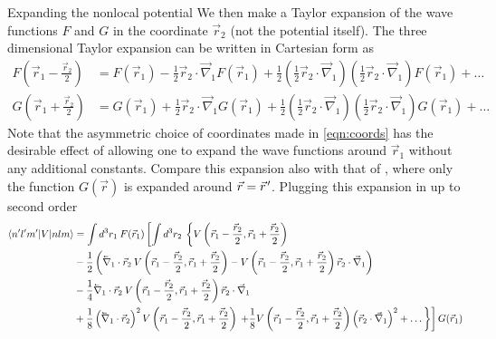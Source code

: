 \begin{section}{Expanding the nonlocal potential}
We then make a Taylor expansion of the wave functions $F$ and $G$ in the coordinate $\vec{r}_2$ (not the potential itself). The three dimensional Taylor expansion can be written in Cartesian form as
\begin{align}\label{eq:TaylorExpansion}
F\left(\vec{r}_1-\frac{\vec{r}_2}{2}\right)&=F(\vec{r}_1)-\frac{1}{2}\vec{r}_2\cdot\vec{\nabla}_1 F(\vec{r}_1)+\frac{1}{2}\left(\frac{1}{2}\vec{r}_2\cdot\vec{\nabla}_1\right)\left(\frac{1}{2}\vec{r}_2\cdot\vec{\nabla}_1\right)F(\vec{r}_1)+\dots 
\\
G\left(\vec{r}_1+\frac{\vec{r}_2}{2}\right)&=G(\vec{r}_1)+\frac{1}{2}\vec{r}_2\cdot\vec{\nabla}_1 G(\vec{r}_1)+\frac{1}{2}\left(\frac{1}{2}\vec{r}_2\cdot\vec{\nabla}_1\right)\left(\frac{1}{2}\vec{r}_2\cdot\vec{\nabla}_1\right)G(\vec{r}_1)+\dots
\end{align}
Note that the asymmetric choice of coordinates made in \eqref{eqn:coords} has the desirable effect of allowing one to expand the wave functions around $\vec{r}_1$ without any additional constants. Compare this expansion also with that of \cite{0954-3899-26-3-310}, where only the function $G(\vec{r})$ is expanded around $\vec{r}=\vec{r}\mkern2mu'$. Plugging this expansion in up to second order 
\begin{equation}\label{eqn:expansionCartesian}
\begin{split}
\braket{n' l' m'| V | n l m} &= \int d^3r_1\: F(\vec{r}_1)\left[\int d^3r_2\:\left\{V\left(\vec{r}_1-\frac{\vec{r}_2}{2},\vec{r}_1+\frac{\vec{r}_2}{2}\right) \right.\right. \\
&-\frac{1}{2} \left(\lvec{\nabla}_1\cdot\vec{r}_2\: V\left(\vec{r}_1-\frac{\vec{r}_2}{2},\vec{r}_1+\frac{\vec{r}_2}{2}\right) -
V\left(\vec{r}_1-\frac{\vec{r}_2}{2},\vec{r}_1+\frac{\vec{r}_2}{2}\right) \vec{r}_2\cdot\vec{\nabla}_1
\right)\\
&-\frac{1}{4}\lvec{\nabla}_1\cdot\vec{r}_2\: V\left(\vec{r}_1-\frac{\vec{r}_2}{2},\vec{r}_1+\frac{\vec{r}_2}{2}\right) \vec{r}_2\cdot\vec{\nabla}_1\\
&+\frac{1}{8}\left(\lvec{\nabla}_{1}\cdot\vec{r}_2\right)^2 V\left(\vec{r}_1-\frac{\vec{r}_2}{2},\vec{r}_1+\frac{\vec{r}_2}{2}\right) 
\left.\left.+\frac{1}{8} V\left(\vec{r}_1-\frac{\vec{r}_2}{2},\vec{r}_1+\frac{\vec{r}_2}{2}\right) \left(\vec{r}_2\cdot\vec{\nabla}_{1}\right)^2+\dots \right\}\right]G(\vec{r}_1)
\end{split}
\end{equation}


\end{section}
